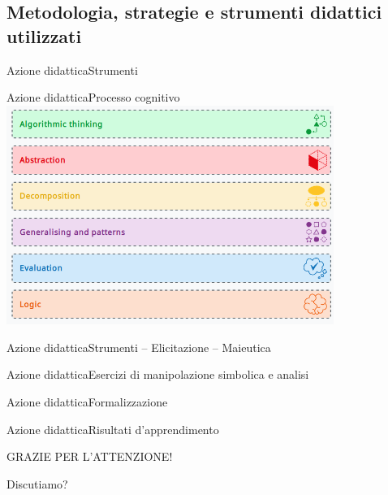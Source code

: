 \documentclass[italian]{beamer}
\begin{document}
\subsection[Azione\ldots]{Metodologia, strategie e strumenti didattici utilizzati}

\begin{frame}{Azione didattica}{Strumenti}
	\centering{}
\end{frame}

\begin{frame}{Azione didattica}{Processo cognitivo}
	\centering\includegraphics[width=0.8\textwidth]{img/pensiero_algoritmico.png}
\end{frame}

\begin{frame}{Azione didattica}{Strumenti -- Elicitazione -- Maieutica}
	\centering{}
\end{frame}

\begin{frame}{Azione didattica}{Esercizi di manipolazione simbolica e analisi}
	\centering{}
\end{frame}

\begin{frame}{Azione didattica}{Formalizzazione}
	\centering{}
\end{frame}

\begin{frame}{Azione didattica}{Risultati d'apprendimento}
	\centering{}
\end{frame}

\begin{frame}[plain]
	
	\vfill
	
	\begin{center}
		{\Large GRAZIE PER L'ATTENZIONE!}
		
		\bigskip
		
		\begin{center}\Huge{Discutiamo?}\end{center}

	\end{center}
	
	\vfill
	
\end{frame}
\end{document}
